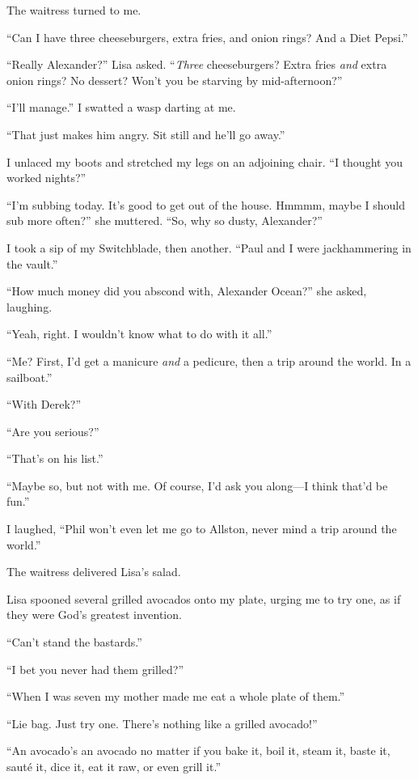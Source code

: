 The waitress turned to me.

``Can I have three cheeseburgers, extra fries, and onion rings? And a
Diet Pepsi.''

``Really Alexander?'' Lisa asked. ``\emph{Three} cheeseburgers? Extra
fries \emph{and} extra onion rings? No dessert? Won't you be starving by
mid-afternoon?''

``I'll manage.'' I swatted a wasp darting at me.

``That just makes him angry. Sit still and he'll go away.''

I unlaced my boots and stretched my legs on an adjoining chair. ``I
thought you worked nights?''

``I'm subbing today. It's good to get out of the house. Hmmmm, maybe I
should sub more often?'' she muttered. ``So, why so dusty, Alexander?''

I took a sip of my Switchblade, then another. ``Paul and I were
jackhammering in the vault.''

``How much money did you abscond with, Alexander Ocean?'' she asked,
laughing.

``Yeah, right. I wouldn't know what to do with it all.''

``Me? First, I'd get a manicure \emph{and} a pedicure, then a trip
around the world. In a sailboat.''

``With Derek?''

``Are you serious?''

``That's on his list.''

``Maybe so, but not with me. Of course, I'd ask you along---I think
that'd be fun.''

I laughed, ``Phil won't even let me go to Allston, never mind a trip
around the world.''

The waitress delivered Lisa's salad.

Lisa spooned several grilled avocados onto my plate, urging me to try
one, as if they were God's greatest invention.

``Can't stand the bastards.''

``I bet you never had them grilled?''

``When I was seven my mother made me eat a whole plate of them.''

``Lie bag. Just try one. There's nothing like a grilled avocado!''

``An avocado's an avocado no matter if you bake it, boil it, steam it,
baste it, sauté it, dice it, eat it raw, or even grill it.''

